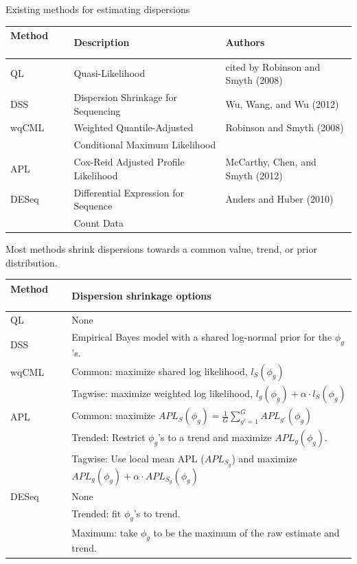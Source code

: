 \documentclass{beamer}
\begin{document}
\begin{frame}
\begin{columns}[t]
\begin{column}{.33\linewidth}
\begin{block}{Existing methods for estimating dispersions}
\begin{center}
\begin{tabular}{lll}
{\bf Method} $\qquad$ & {\bf Description} & {\bf Authors} \\ \hline
QL & Quasi-Likelihood & cited by Robinson and Smyth (2008) \\ \hline
DSS & Dispersion Shrinkage for Sequencing & Wu, Wang, and Wu (2012) \\ \hline
wqCML & Weighted Quantile-Adjusted  & Robinson and Smyth (2008) \\ 
& Conditional Maximum Likelihood & \\ \hline
APL & Cox-Reid Adjusted Profile Likelihood $\qquad $& McCarthy, Chen, and Smyth (2012) \\ \hline
DESeq & Differential Expression for Sequence  & Anders and Huber (2010) \\
& Count Data &
\end{tabular} 
\end{center}
\end{block}

\begin{block}{Most methods shrink dispersions towards a common value, trend, or prior distribution.}
\begin{center}
\begin{tabular}{ll}
{\bf Method }$\qquad$& {\bf Dispersion shrinkage options } \\ \hline
QL & None \\ \hline
DSS & Empirical Bayes model with a shared log-normal prior for the $\phi_g$'s. \\ \hline
wqCML & Common: maximize shared log likelihood, $l_S(\phi_g)$  \\
& Tagwise: maximize weighted log likelihood, $l_g(\phi_g) + \alpha \cdot l_S(\phi_g) $\\ \hline
APL & Common: maximize $APL_S(\phi_g) = \frac{1}{G} \sum_{g' = 1}^G APL_{g'}(\phi_g)$ \\
& Trended: Restrict $\phi_g$'s to a trend and maximize $APL_g(\phi_g)$. \\
& Tagwise: Use local mean APL ($APL_{S_g}$) and maximize $APL_g(\phi_g) + \alpha \cdot APL_{S_g}(\phi_g)$  \\ \hline
DESeq & None  \\
& Trended: fit $\phi_g$'s to trend. \\
& Maximum: take $\phi_g$ to be the maximum of the raw estimate and trend. 
\end{tabular}
\end{center}
\end{block}
    

\end{column}
\end{columns}
\end{frame}
\end{document}
